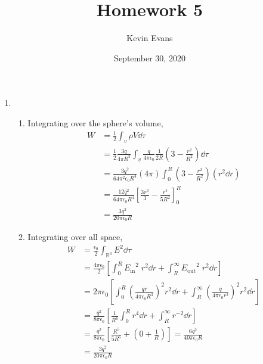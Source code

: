 \documentclass{homework}
\title{Homework 5}
\author{Kevin Evans}
\date{September 30, 2020}
\begin{document}
	\maketitle
	\begin{enumerate}
		\item \begin{enumerate}
			\item Integrating over the sphere's volume, \begin{align*}
				W & = \frac{1}{2} \int_v \rho V \dd{\tau} \\
					& = \frac{1}{2} \frac{3q}{4 \pi R^3} \int_v \frac{q}{4 \pi \epsilon_0}
					\frac{1}{2 R} \left(3 - \frac{r^2}{R^2}\right) \dd{\tau} \\
					& = \frac{3q^2}{64 \pi^2 \epsilon_0 R^4} \left(4 \pi \right) \int_0^R \left(3 - \frac{r^2}{R^2}\right) \left(r^2 \dd{r}\right) \\
					& = \frac{12q^2}{64 \pi \epsilon_0 R^4} \left[\frac{3r^3}{3} - \frac{r^5}{5R^2}\right]_0^R \\
					& = \frac{3q^2}{20 \pi \epsilon_0 R}
			\end{align*}
		
			\item Integrating over all space, \begin{align*}
				W & = \frac{\epsilon_0}{2} \int_{\mathbb{R}^3} E^2 \dd{\tau} \\
					& = \frac{4 \pi \epsilon_0}{2} \left[\int_0^R {E_\mathrm{in}}^2 \; r^2\dd{r}
					+ \int_R^\infty {E_\mathrm{out}}^2 \; r^2 \dd{r}
					 \right] \\
					& = 2\pi\epsilon_0 \left[\int_0^R \left(\frac{qr}{4 \pi \epsilon_0 R^3} \right)^2 r^2 \dd{r} + \int_{R}^{\infty} \left(\frac{q}{4 \pi \epsilon_0 r^2}\right)^2 r^2 \dd{r} \right] \\
					& = \frac{q^2}{8 \pi \epsilon_0} \left[ \frac{1}{R^6} \int_0^R r^4 \dd{r} + \int_R^\infty r^{-2} \dd{r} \right] \\
					& = \frac{q^2}{8 \pi \epsilon_0} \left[ \frac{R^5}{5R^6} + \left(0 + \frac{1}{R} \right) \right] = \frac{6q^2}{40 \pi \epsilon_0 R} \\
					& = \frac{3q^2}{20 \pi \epsilon_0 R}
			\end{align*}
		

\end{enumerate}
\end{enumerate}
\end{document}
